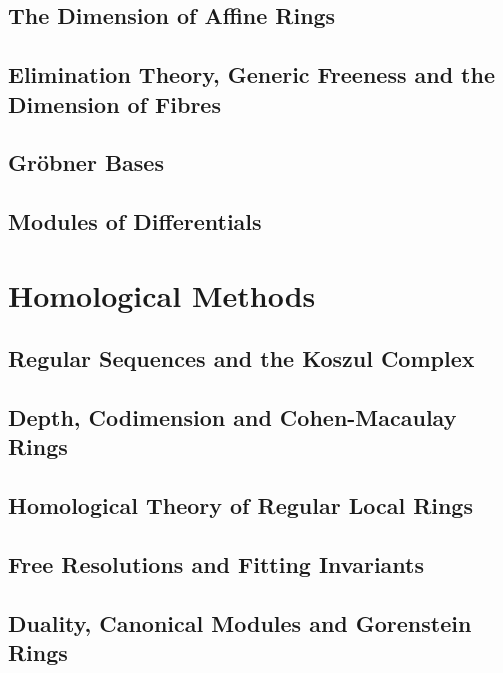 \subsection{The Dimension of Affine Rings}
\subsection{Elimination Theory, Generic Freeness and the Dimension of Fibres}
\subsection{Gröbner Bases}
\subsection{Modules of Differentials}

\section{Homological Methods}
\subsection{Regular Sequences and the Koszul Complex}
\subsection{Depth, Codimension and Cohen-Macaulay Rings}
\subsection{Homological Theory of Regular Local Rings}
\subsection{Free Resolutions and Fitting Invariants}
\subsection{Duality, Canonical Modules and Gorenstein Rings}

